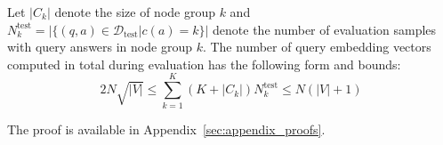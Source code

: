 \begin{proposition}
\label{proposition:complexity}
Let $|C_k|$ denote the size of node group $k$ and $N_k^{\text{test}}=|\{(q, a) \in \mathcal{D}_{\text{test}}|c(a)=k\}|$ denote the number of evaluation samples with query answers in node group $k$. The number of query embedding vectors computed in total during evaluation has the following form and bounds:
\begin{equation}
\label{eq:complexity_and_bounds}
2 N \sqrt{|V|} \leq \sum_{k=1}^{K}{\left(K+|C_k|\right)N_k^{\text{test}}} \leq N \left(|V| + 1\right) 
\end{equation}
\end{proposition}
The proof is available in Appendix~\ref{sec:appendix_proofs}.
    

